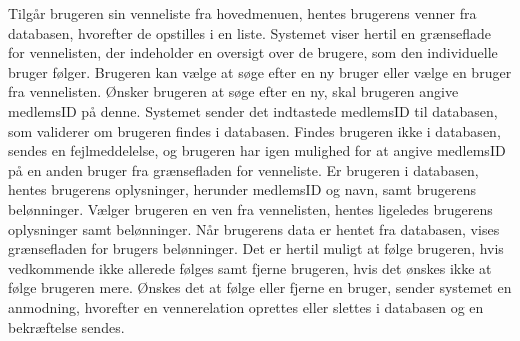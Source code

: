 \noindent
Tilgår brugeren sin venneliste fra hovedmenuen, hentes brugerens venner fra databasen, hvorefter de opstilles i en liste. Systemet viser hertil en grænseflade for vennelisten, der indeholder en oversigt over de brugere, som den individuelle bruger følger. Brugeren kan vælge at søge efter en ny bruger eller vælge en bruger fra vennelisten. Ønsker brugeren at søge efter en ny, skal brugeren angive medlemsID på denne. Systemet sender det indtastede medlemsID til databasen, som validerer om brugeren findes i databasen. Findes brugeren ikke i databasen, sendes en fejlmeddelelse, og brugeren har igen mulighed for at angive medlemsID på en anden bruger fra grænsefladen for venneliste. Er brugeren i databasen, hentes brugerens oplysninger, herunder medlemsID og navn, samt brugerens belønninger. Vælger brugeren en ven fra vennelisten, hentes ligeledes brugerens oplysninger samt belønninger. Når brugerens data er hentet fra databasen, vises grænsefladen for brugers belønninger. Det er hertil muligt at følge brugeren, hvis vedkommende ikke allerede følges samt fjerne brugeren, hvis det ønskes ikke at følge brugeren mere. Ønskes det at følge eller fjerne en bruger, sender systemet en anmodning, hvorefter en vennerelation oprettes eller slettes i databasen og en bekræftelse sendes. 




